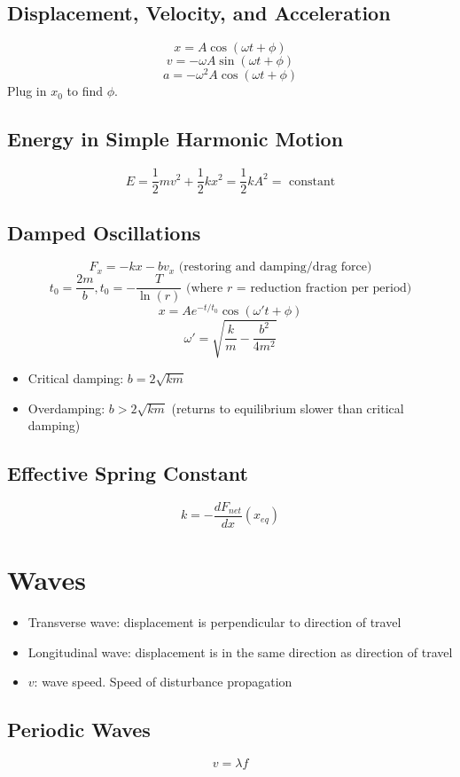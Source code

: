 \documentclass{article}
\begin{document}
\subsection{Displacement, Velocity, and Acceleration}
\[x=A\cos(\omega t+\phi)\]
\[v=-\omega A\sin(\omega t+\phi)\]
\[a=-\omega^2 A\cos(\omega t+\phi)\]
Plug in $x_0$ to find $\phi$.

\subsection{Energy in Simple Harmonic Motion}
\[E=\frac{1}{2}mv^2+\frac{1}{2}kx^2=\frac{1}{2}kA^2=\text{ constant}\]

\subsection{Damped Oscillations}
\[F_x=-kx-bv_x \text{ (restoring and damping/drag force)}\]
\[t_0=\frac{2m}{b}, t_0=-\frac{T}{\ln(r)} \text{ (where $r$ = reduction fraction per period)}\]
\[x=Ae^{-t/t_0}\cos(\omega' t+\phi)\]
\[\omega'=\sqrt{\frac{k}{m}-\frac{b^2}{4m^2}}\]
\begin{itemize}
    \item Critical damping: $b=2\sqrt{km}$
    \item Overdamping: $b>2\sqrt{km}$ (returns to equilibrium slower than critical damping)
\end{itemize}

\subsection{Effective Spring Constant}
\[k=-\frac{dF_{net}}{dx}(x_{eq})\]

\section{Waves}
\begin{itemize}
    \item Transverse wave: displacement is perpendicular to direction of travel
    \item Longitudinal wave: displacement is in the same direction as direction of travel 
    \item $v$: wave speed. Speed of disturbance propagation
\end{itemize}

\subsection{Periodic Waves}
\[v=\lambda f\]
\end{document}

